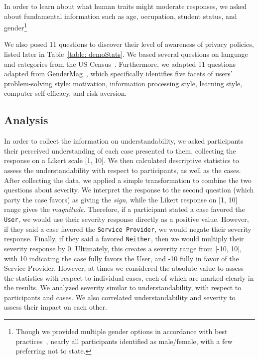 
In order to learn about what human traits might moderate responses, we asked about fundamental information such as age, occupation, student status, and gender\footnote{Though we provided multiple gender options in accordance with best practices~\cite{scheuerman2020gender}, nearly all participants identified as male/female, with a few preferring not to state.
} %

We also posed 11 questions to discover their level of awareness of privacy policies, listed later in Table~\ref{table: demoStats}.
We based several questions on language and categories from the US Census~\cite{UScensus}.
Furthermore, we adapted 11 questions adapted from GenderMag~\cite{burnett2016gendermag}, which specifically identifies five facets of users' problem-solving style: motivation, information processing style, learning style, computer self-efficacy, and risk aversion.

\subsection{Analysis}
\label{secAnalysis}

In order to collect the information on understandability, we asked participants their perceived understanding of each case presented to them, collecting the response on a Likert scale [1, 10].
We then calculated descriptive statistics to assess the understandability with respect to participants, as well as the cases.
After collecting the data, we applied a simple transformation to combine the two questions about severity.
We interpret the response to the second question (which party the case favors) as giving the \emph{sign}, while the Likert response on [1, 10] range gives the \textit{magnitude}.
Therefore, if a participant stated a case favored the \texttt{User}, we would use their severity response directly as a positive value.
However, if they said a case favored the \texttt{Service Provider}, we would negate their severity response.
Finally, if they said a favored \texttt{Neither}, then we would multiply their severity response by 0.
Ultimately, this creates a severity range from [-10, 10], with 10 indicating the case fully favors the User, and -10 fully in favor of the Service Provider.
However, at times we considered the absolute value to assess the statistics with respect to individual cases, each of which are marked clearly in the results.
We analyzed severity similar to understandability, with respect to participants and cases.
We also correlated understandability and severity to assess their impact on each other.

